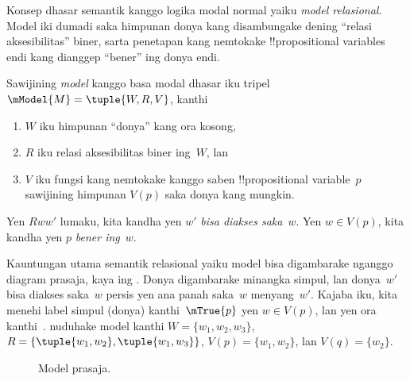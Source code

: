 \documentclass[../../../include/open-logic-section]{subfiles}
\begin{document}


Konsep dhasar semantik kanggo logika modal normal yaiku
\emph{model relasional}. Model iki dumadi saka himpunan donya kang
disambungake dening ``relasi aksesibilitas'' biner, sarta penetapan
kang nemtokake !!{propositional variable}s endi kang dianggep
``bener'' ing donya endi.

\begin{defn}
  Sawijining \emph{model} kanggo basa modal dhasar iku tripel $\mModel{M}
  = \tuple{W, R, V}$, kanthi
  \begin{enumerate}
  \item $W$ iku himpunan ``donya'' kang ora kosong,
  \item $R$ iku relasi aksesibilitas biner ing~$W$, lan
  \item $V$ iku fungsi kang nemtokake kanggo saben !!{propositional
    variable}~$p$ sawijining himpunan $V(p)$ saka donya kang mungkin.
  \end{enumerate}
  Yen $Rww'$ lumaku, kita kandha yen $w'$ \emph{bisa diakses
    saka}~$w$. Yen $w \in V(p)$, kita kandha yen $p$ \emph{bener ing}~$w$.
\end{defn}

Kauntungan utama semantik relasional yaiku model bisa
digambarake nganggo diagram prasaja, kaya ing .
Donya digambarake minangka simpul, lan donya~$w'$ bisa diakses
saka~$w$ persis yen ana panah saka~$w$ menyang~$w'$. Kajaba iku,
kita menehi label simpul (donya) kanthi~$\mTrue{p}$ yen $w \in V(p)$,
lan yen ora kanthi~.  nuduhake model
kanthi $W = \{w_1, w_2, w_3\}$, $R = \{\tuple{w_1, w_2},\tuple{w_1,
  w_3}\}$, $V(p) = \{w_1, w_2\}$, lan $V(q) = \{w_2\}$.

\begin{figure}
  \begin{center}
  \end{center}
  \caption{Model prasaja.}
\end{figure}
\end{document}

